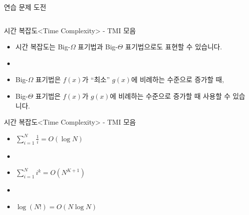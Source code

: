 \begin{frame}{연습 문제 도전}
  \begin{columns}[T]
  \end{columns}
\end{frame}


\begin{frame}{시간 복잡도}{<Time Complexity> - TMI 모음}
  \begin{itemize}
    \item 시간 복잡도는 Big-$\Omega$ 표기법과 Big-$\Theta$ 표기법으로도 표현할 수 있습니다.
    \item[] \vspace{2mm}
    \item Big-$\Omega$ 표기법은 $f(x)$가 ``최소'' $g(x)$에 비례하는 수준으로 증가할 때,
    \item Big-$\Theta$ 표기법은 $f(x)$가 $g(x)$에 비례하는 수준으로 증가할 때
      사용할 수 있습니다.
  \end{itemize}
\end{frame}

\begin{frame}{시간 복잡도}{<Time Complexity> - TMI 모음}
  \begin{itemize}
    \item[] $\displaystyle\sum_{i=1}^{N} \frac{1}{i} = O(\log N)$
    \item[] \vspace{2mm}
    \item[] $\displaystyle\sum_{i=1}^{N} i^k = O(N^{K+1})$
    \item[] \vspace{2mm}
    \item[] $\log(N!) = O(N \log N)$
  \end{itemize}
\end{frame}

\closingframe


